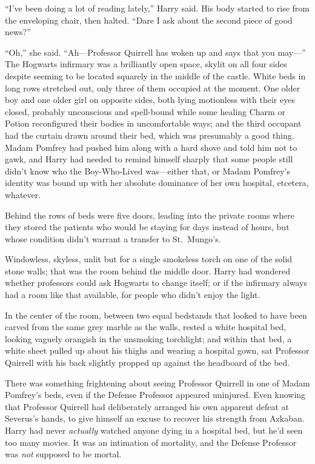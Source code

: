 “I’ve been doing a lot of reading lately,” Harry said. His body started to rise from the enveloping chair, then halted. “Dare I ask about the second piece of good news?”

“Oh,” she said. “Ah—Professor Quirrell has woken up and says that you may—”
\sbreak
The Hogwarts infirmary was a brilliantly open space, skylit on all four sides despite seeming to be located squarely in the middle of the castle. White beds in long rows stretched out, only three of them occupied at the moment. One older boy and one older girl on opposite sides, both lying motionless with their eyes closed, probably unconscious and spell-bound while some healing Charm or Potion reconfigured their bodies in uncomfortable ways; and the third occupant had the curtain drawn around their bed, which was presumably a good thing. Madam Pomfrey had pushed him along with a hard shove and told him not to gawk, and Harry had needed to remind himself sharply that some people still didn’t know who the Boy-Who-Lived was—either that, or Madam Pomfrey’s identity was bound up with her absolute dominance of her own hospital, etcetera, whatever.

Behind the rows of beds were five doors, leading into the private rooms where they stored the patients who would be staying for days instead of hours, but whose condition didn’t warrant a transfer to St.~Mungo’s.

Windowless, skyless, unlit but for a single smokeless torch on one of the solid stone walls; that was the room behind the middle door. Harry had wondered whether professors could ask Hogwarts to change itself; or if the infirmary always had a room like that available, for people who didn’t enjoy the light.

In the center of the room, between two equal bedstands that looked to have been carved from the same grey marble as the walls, rested a white hospital bed, looking vaguely orangish in the unsmoking torchlight; and within that bed, a white sheet pulled up about his thighs and wearing a hospital gown, sat Professor Quirrell with his back slightly propped up against the headboard of the bed.

There was something frightening about seeing Professor Quirrell in one of Madam Pomfrey’s beds, even if the Defense Professor appeared uninjured. Even knowing that Professor Quirrell had deliberately arranged his own apparent defeat at Severus’s hands, to give himself an excuse to recover his strength from Azkaban. Harry had never \emph{actually} watched anyone dying in a hospital bed, but he’d seen too many movies. It was an intimation of mortality, and the Defense Professor was \emph{not} supposed to be mortal.

